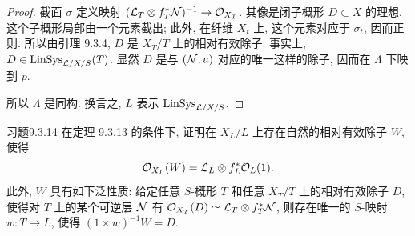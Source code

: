 \begin{proof}
截面 $\sigma$ 定义映射 $(\mathcal L_T\otimes f_T^*\mathcal N)^{-1}\to\mathcal O_{X_T}$. 其像是闭子概形 $D\subset X$ 的理想, 这个子概形局部由一个元素截出; 此外, 在纤维 $X_t$ 上, 这个元素对应于 $\sigma_t$, 因而正则. 所以由引理 9.3.4, $D$ 是 $X_T/T$ 上的相对有效除子. 事实上, $D\in\operatorname{LinSys}_{\mathcal L/X/S}(T)$. 显然 $D$ 是与 $(\mathcal N,u)$ 对应的唯一这样的除子, 因而在 $\Lambda$ 下映到 $p$.

所以 $\Lambda$ 是同构. 换言之, $L$ 表示 $\operatorname{LinSys}_{\mathcal L/X/S}$.
\end{proof}

\begin{origstatement}{习题}{9.3.14}\label{ch09s03:ex9314}
在定理 9.3.13 的条件下, 证明在 $X_L/L$ 上存在自然的相对有效除子 $W$, 使得
\[
\mathcal O_{X_L}(W)=\mathcal L_L\otimes f_L^*\mathcal O_L(1).
\]
此外, $W$ 具有如下泛性质: 给定任意 $S$-概形 $T$ 和任意 $X_T/T$ 上的相对有效除子 $D$, 使得对 $T$ 上的某个可逆层 $\mathcal N$ 有 $\mathcal O_{X_T}(D)\simeq\mathcal L_T\otimes f_T^*\mathcal N$, 则存在唯一的 $S$-映射 $w:T\to L$, 使得 $(1\times w)^{-1}W=D$.
\end{origstatement}

\endgroup
